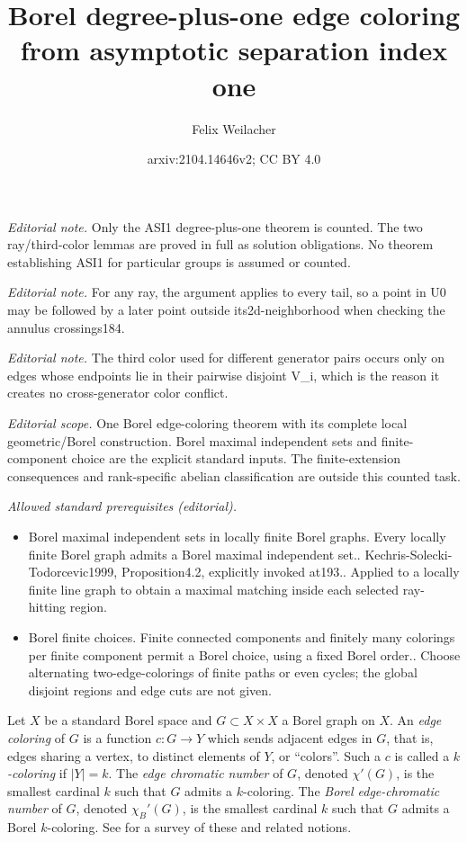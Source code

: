 \documentclass[10pt,a4paper]{article}
\title{Borel degree-plus-one edge coloring from asymptotic separation index one}
\author{Felix Weilacher}
\date{arxiv:2104.14646v2; CC BY 4.0}
\newcommand{\0}{\varnothing}
\begin{document}
\maketitle
\noindent\textit{Editorial note.} Only the ASI1 degree-plus-one theorem is counted. The two ray/third-color lemmas are proved in full as solution obligations. No theorem establishing ASI1 for particular groups is assumed or counted.\par\medskip
\noindent\textit{Editorial note.} For any ray, the argument applies to every tail, so a point in U0 may be followed by a later point outside its2d-neighborhood when checking the annulus crossings184.\par\medskip
\noindent\textit{Editorial note.} The third color used for different generator pairs occurs only on edges whose endpoints lie in their pairwise disjoint V\_i, which is the reason it creates no cross-generator color conflict.\par\medskip
\noindent\textit{Editorial scope.} One Borel edge-coloring theorem with its complete local geometric/Borel construction. Borel maximal independent sets and finite-component choice are the explicit standard inputs. The finite-extension consequences and rank-specific abelian classification are outside this counted task.\par\medskip
\noindent\textit{Allowed standard prerequisites (editorial).}\begin{itemize}
\item Borel maximal independent sets in locally finite Borel graphs. Every locally finite Borel graph admits a Borel maximal independent set.. Kechris-Solecki-Todorcevic1999, Proposition4.2, explicitly invoked at193.. Applied to a locally finite line graph to obtain a maximal matching inside each selected ray-hitting region.
\item Borel finite choices. Finite connected components and finitely many colorings per finite component permit a Borel choice, using a fixed Borel order.. Choose alternating two-edge-colorings of finite paths or even cycles; the global disjoint regions and edge cuts are not given.
\end{itemize}\medskip
Let $X$ be a standard Borel space and $G \subset X \times X$ a Borel graph on $X$. An \textit{edge coloring} of $G$ is a function $c:G \rightarrow Y$ which sends adjacent edges in $G$, that is, edges sharing a vertex, to distinct elements of $Y$, or ``colors''. Such a $c$ is called a \textit{$k$-coloring} if $|Y| = k$. The \textit{edge chromatic number} of $G$, denoted $\chi'(G)$, is the smallest cardinal $k$ such that $G$ admits a $k$-coloring. The \textit{Borel edge-chromatic number} of $G$, denoted $\chi_B'(G)$, is the smallest cardinal $k$ such that $G$ admits a Borel $k$-coloring. See \cite{KM} for a survey of these and related notions.
\end{document}
